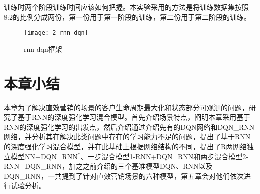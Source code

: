 训练时两个阶段训练时间应该如何把握。本实验采用的方法是将训练数据集按照8:2的比例分成两份，第一份用于第一阶段的训练，第二份用于第二阶段的训练。

\begin{figure}[htbp]
\centering
\texttt{[image: 2-rnn-dqn]}
\caption{rnn-dqn框架}
\label{fig:2-rnn-dqn}
\end{figure}





\section{本章小结}
本章为了解决直效营销的场景的客户生命周期最大化和状态部分可观测的问题，研究了基于RNN的深度强化学习混合模型。首先介绍场景特点，阐明本章采用基于RNN的深度强化学习的出发点，然后介绍通过介绍先有的DQN网络和DQN\_RNN网络，并分析其在解决此类问题中存在的学习能力不足的问题，提出了基于RNN的深度强化学习混合模型，并在此基础上根据网络结构的不同，提出了R两网络独立模型NN+DQN_RNN$^{*}$、一步混合模型1-RNN+DQN\_RNN和两步混合模型2-RNN+DQN\_RNN，加之之前介绍的三个基准模型DQN、RNN以及DQN_RNN，一共提到了针对直效营销场景的六种模型，第五章会对他们依次进行试验分析。

